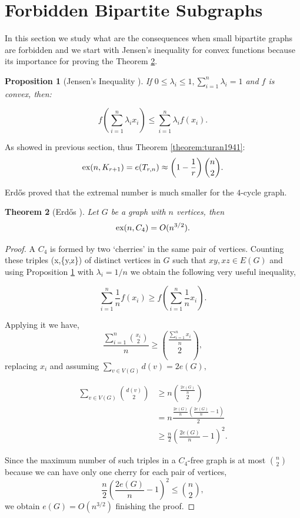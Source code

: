 \documentclass[12pt,twoside,a4paper,bibliography=totocnumbered]{book}
\numberwithin{equation}{section}
\newtheorem{theorem}             {Theorem}[section]
\newtheorem{proposition}[theorem] {Proposition}
\theoremstyle{remark}
\def\ex{\mathop{\text{\rm ex}}\nolimits}
\begin{document}
\section{Forbidden Bipartite Subgraphs}
In this section we study what are the consequences when small bipartite graphs are forbidden and we start with Jensen's inequality for convex functions because its importance for proving the Theorem \ref{theorem: Erdos,1938}.
\begin{proposition}[{Jensen's Inequality \cite{Je06}}]\label{prep:jensen}
 If $0\leq \lambda_i \leq 1, \sum_{i=1}^n \lambda_i = 1$ and $f$ is convex, then:

$$
f \left( \sum_{i=1}^n \lambda_i x_i\right) \leq \sum_{i=1}^n \lambda_i f (x_i).
$$

\end{proposition}

As showed in previous section, thus Theorem \ref{theorem:turan1941}:
$$ \ex (n,K_{r+1}) = e(T_{r,n}) \approx \left( 1-\frac{1}{r}\right) \binom{n}{2} .$$

Erd\H{o}s proved that the extremal number is much smaller for the $4$-cycle graph.
 
\begin{theorem}[{Erd\H{o}s \cite{Er38}}] \label{theorem: Erdos,1938} Let $G$ be a graph with $n$ vertices, then
$$\ex(n,C_4) = O(n^{3/2}).$$
\end{theorem}

\begin{proof}
A $C_4$ is formed by two `cherries' in the same pair of vertices. Counting these triples (x,\{y,z\}) of distinct vertices in $G$ such that $xy, xz \in E(G)$ and using Proposition \ref{prep:jensen} with $\lambda_i = 1/n$ we obtain the following very useful inequality,

$$ \sum_{i=1}^n \frac{1}{n} f\left(x_i\right) \geq f\left(\sum_{i=1}^n \frac{1}{n} x_i\right).$$

Applying it we have,
$$ \frac{\sum_{i=1}^n \binom{x_i}{2}}{n} \geq \binom{\frac{\sum_{i=1}^n x_i}{n}}{2} ,$$
replacing $x_i$ and assuming $\sum_{v \in V(G)} d(v) = 2e(G),$

\begin{align*}
\sum_{v \in V(G)} \binom{d(v)}{2} &\geq n \binom{\frac{2e(G)}{n}}{2}\\
&= n\frac{\frac{2e(G)}{n}\left( \frac{2e(G)}{n}-1\right)}{2} \\
&\geq \frac{n}{2} \left( \frac{2e(G)}{n} - 1 \right)^2.
\end{align*}

Since the maximum number of such triples in a $C_4$-free graph is at most $\binom{n}{2}$ because we can have only one cherry for each pair of vertices,
$$ \frac{n}{2}\left(\frac{2e(G)}{n} - 1\right)^2 \leq \binom{n}{2},$$
we obtain $e(G) = O(n^{3/2})$ finishing the proof.
\end{proof}
\end{document}
